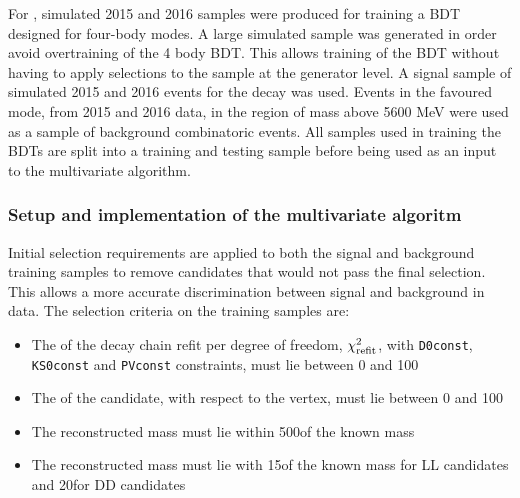For \kpipipi, simulated 2015 and 2016 samples were produced for training a BDT designed for four-body modes. A large \runtwo simulated sample was generated in order avoid overtraining of the 4 body BDT. This allows training of the BDT without having to apply selections to the sample at the generator level. A signal sample of simulated 2015 and 2016 events for the decay \kpipipi was used. Events in the favoured \kpipipi mode, from 2015 and 2016 data, in the region of \Bm mass above 5600 MeV were used as a sample of background combinatoric events. All samples used in training the BDTs are split into a training and testing sample before being used as an input to the multivariate algorithm.

\subsubsection{Setup and implementation of the multivariate algoritm}

Initial selection requirements are applied to both the signal and background training samples to remove candidates that would not pass the final selection. This allows a more accurate discrimination between signal and background in data. The selection criteria on the training samples are:

\begin{itemize}
\item The \chisq of the decay chain refit per degree of freedom, $\chi^2_\text{refit}$, with {\tt D0const}, {\tt KS0const} and {\tt PVconst} constraints, must lie between 0 and 100
\item The \chisqip of the \Bm candidate, with respect to the \Bm vertex, must lie between 0 and 100
\item The reconstructed \Kstarm mass must lie within 500\mev of the known \Kstarm mass
\item The reconstructed \KS mass must lie with 15\mev of the known \KS mass for LL candidates and 20\mev for DD candidates
\end{itemize}

